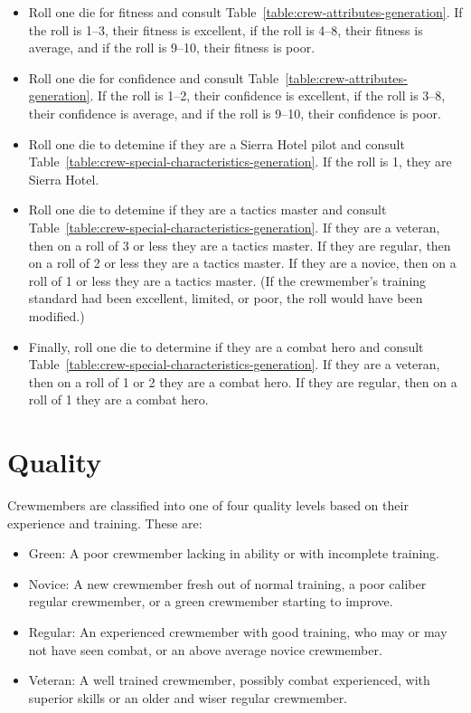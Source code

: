 \begin{advancedrules}
{\begin{itemize}
\item Roll one die for fitness and consult Table~\ref{table:crew-attributes-generation}. If the roll is 1--3, their fitness is excellent, if the roll is 4--8, their fitness is average, and if the roll is 9--10, their fitness is poor. 

\item Roll one die for confidence and consult Table~\ref{table:crew-attributes-generation}. If the  roll is 1--2, their confidence is excellent, if the roll is 3--8, their confidence is average, and if the roll is 9--10, their confidence is poor. 

\item Roll one die to detemine if they are a Sierra Hotel pilot and consult Table~\ref{table:crew-special-characteristics-generation}. If the roll is 1, they are Sierra Hotel. 

\item Roll one die to detemine if they are a tactics master and consult Table~\ref{table:crew-special-characteristics-generation}. If they are a veteran, then on a roll of 3 or less they are a tactics master. If they are regular, then on a roll of 2 or less they are a tactics master. If they are a novice, then on a roll of 1 or less they are a tactics master. (If the crewmember's training standard had been excellent, limited, or poor, the roll would have been modified.)

\item Finally, roll one die to determine if they are a combat hero and consult Table~\ref{table:crew-special-characteristics-generation}.  If they are a veteran, then on a roll of 1 or 2 they are a combat hero. If they are regular, then on a roll of 1 they are a combat hero.
\end{itemize}

\section{Quality}
\label{rule:crew-quality}

Crewmembers are classified into one of four quality levels based on their experience and training. These are:

\begin{itemize}
    \item Green: A poor crewmember lacking in ability or with incomplete training.
    \item Novice: A new crewmember fresh out of normal training, a poor caliber regular crewmember, or a green crewmember starting to improve.
    \item Regular: An experienced crewmember with good training, who may or may not have seen combat, or an above average novice crewmember.
    \item Veteran: A well trained crewmember, possibly combat experienced, with superior skills or an older and wiser regular crewmember.
\end{itemize}

}
\end{advancedrules}
